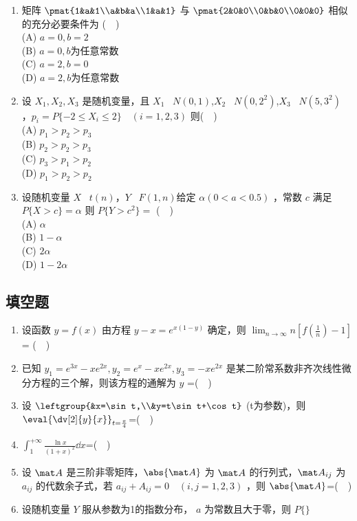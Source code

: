 \begin{enumerate}
\item  矩阵 $\pmat{1&a&1\\a&b&a\\1&a&1}$ 与 $\pmat{2&0&0\\0&b&0\\0&0&0}$ 相似的充分必要条件为 ($\quad$)\\
(A) $a=0,b=2$\\
(B) $a=0,b$为任意常数\\
(C) $a=2,b=0$\\
(D) $a=2,b$为任意常数
\item  设 $X_1,X_2,X_3$ 是随机变量，且 $X_1 $~ $N(0,1)$,$X_2 $~ $N(0,2^2)$,$X_3 $~ $N(5,3^2)$ ，$p_i=P\{-2 \le X_i \le2\}\quad  (i=1,2,3)$ 则($\quad$)\\
(A)  $p_1>p_2>p_3$\\
(B)  $p_2>p_2>p_3$\\
(C)  $p_3>p_1>p_2$\\
(D) $p_1>p_2>p_2$\\
\item 设随机变量 $X$~ $t(n)$，$Y$~ $F(1,n)$给定 $\alpha(0<a<0.5)$ ，常数 $c$ 满足 $P\{X>c\}=\alpha$  则  $P\{Y>c^2\}=$ ($\quad$)\\
(A) $\alpha$\\
(B) $1-\alpha$\\
(C) $2\alpha$\\
(D) $1-2\alpha $
\end{enumerate}
\subsection{填空题}
\begin{enumerate}
\item 设函数 $y=f(x)$ 由方程 $y-x=e^{x(1-y)}$ 确定，则  $\displaystyle \lim_{n\to\infty} n[f(\frac{1}{n})-1]$ = ($\quad$)
\item  已知 $y_1=e^{3x}-xe^{2x},y_2=e^x-xe^{2x},y_3=-xe^{2x}$  是某二阶常系数非齐次线性微分方程的三个解，则该方程的通解为 $y$ =($\quad$)
\item  设
$\leftgroup{&x=\sin t,\\&y=t\sin t+\cos t}$  (t为参数)，则$\displaystyle \eval{ \dv[2]{y}{x}}_{t =\frac{\pi}{4}}$=($\quad$)
\item $\displaystyle \int_{1}^{+\infty }\frac{\ln x}{(1+x)^2}\dd{x}$=($\quad$)
\item 设 $\mat A $ 是三阶非零矩阵，$\abs{\mat A}$   为 $\mat A$ 的行列式，$\mat A_{ij}$  为 $a_{ij}$ 的代数余子式，若 $a_{ij}+A_{ij}=0 \quad (i,j=1,2,3)$ ，则 $\abs{\mat A}$=($\quad$)
\item 设随机变量 $Y$ 服从参数为1的指数分布， $a$ 为常数且大于零，则  $P\{\}$
\end{enumerate}